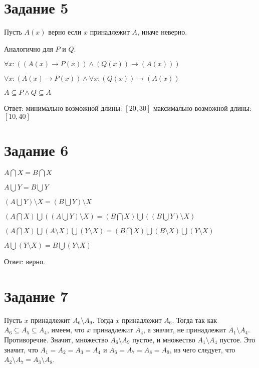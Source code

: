 \documentclass[a4paper, 12pt]{article}
\begin{document}
	\section*{Задание 5}
		Пусть $A(x)$ верно если $x$ принадлежит $A$, иначе неверно.\par
		Аналогично для $P$ и $Q$.\par
		$\forall x : ((A(x) \to P(x)) \land (Q(x)) \to (A(x)))$\par
		$\forall x : (A(x) \to P(x)) \land \forall x :(Q(x)) \to (A(x))$\par
		$A \subseteq P \land Q \subseteq A$\par
		Ответ: минимально возможной длины: $[20,30]$ максимально возможной длины: $[10,40]$
	\section*{Задание 6}
		$A \bigcap X = B \bigcap X$\par
		$A \bigcup Y = B \bigcup Y$\par
		$(A \bigcup Y) \setminus X = (B \bigcup Y) \setminus X$\par
		$(A\bigcap X) \bigcup ((A \bigcup Y)\setminus X) = (B\bigcap X) \bigcup ((B \bigcup Y)\setminus X)$\par
		$(A\bigcap X) \bigcup (A\setminus X) \bigcup (Y\setminus X) = (B\bigcap X) \bigcup (B\setminus X) \bigcup (Y\setminus X)$\par
		$A \bigcup (Y\setminus X) = B \bigcup (Y\setminus X)$\par
		Ответ: верно.
	\section*{Задание 7}
		Пусть $x$ принадлежит $A_6\setminus A_9$. Тогда $x$ принадлежит $A_6$. Тогда так как $A_6 \subseteq A_5 \subseteq A_4$, имеем, что $x$ принадлежит $A_4$, а значит, не принадлежит $A_1 \setminus A_4$. Противоречие. Значит, множество $A_6\setminus A_9$ пустое, и множество $A_1 \setminus A_4$ пустое. Это значит, что $A_1=A_2=A_3=A_4$ и $A_6=A_7=A_8=A_9$, из чего следует, что $A_2\setminus A_7=A_3\setminus A_8$.
\end{document}
